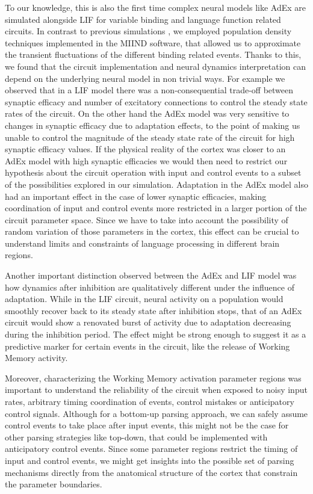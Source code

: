 \documentclass[10pt]{article}
\begin{document}
To our knowledge, this is also the first time complex neural models like AdEx are simulated alongside LIF for variable binding and language function related circuits.
In contrast to previous simulations \cite{van_der_Velde_2011, van_der_Velde_2010, Frank_2014,van_Dijk_2015}, we employed population density techniques implemented in the MIIND software\cite{de_Kamps_2008}, that allowed us to approximate the transient fluctuations of the different binding related events.
Thanks to this, we found that the circuit implementation and neural dynamics interpretation can depend on the underlying neural model in non trivial ways.
For example we observed that in a LIF model there was a non-consequential trade-off between synaptic efficacy and number of excitatory connections to control the steady state rates of the circuit.
On the other hand the AdEx model was very sensitive to changes in synaptic efficacy due to adaptation effects, to the point of making us unable to control the magnitude of the steady state rate of the circuit for high synaptic efficacy values.
If the physical reality of the cortex was closer to an AdEx model with high synaptic efficacies we would then need to restrict our hypothesis about the circuit operation with input and control events to a subset of the possibilities explored in our simulation.
Adaptation in the AdEx model also had an important effect in the case of lower synaptic efficacies, making coordination of input and control events more restricted in a larger portion of the circuit parameter space.
Since we have to take into account the possibility of random variation of those parameters in the cortex, this effect can be crucial to understand limits and constraints of language processing in different brain regions.

Another important distinction observed between the AdEx and LIF model was how dynamics after inhibition are qualitatively different under the influence of adaptation.
While in the LIF circuit, neural activity on a population would smoothly recover back to its steady state after inhibition stops, that of an AdEx circuit would show a renovated burst of activity due to adaptation decreasing during the inhibition period.
The effect might be strong enough to suggest it as a predictive marker for certain events in the circuit, like the release of Working Memory activity.

Moreover, characterizing the Working Memory activation parameter regions was important to understand the reliability of the circuit when exposed to noisy input rates, arbitrary timing coordination of events, control mistakes or anticipatory control signals.
Although for a bottom-up parsing approach, we can safely assume control events to take place after input events, this might not be the case for other parsing strategies like top-down, that could be implemented with anticipatory control events.
Since some parameter regions restrict the timing of input and control events, we might get insights into the possible set of parsing mechanisms directly from the anatomical structure of the cortex that constrain the parameter boundaries.
\end{document}
